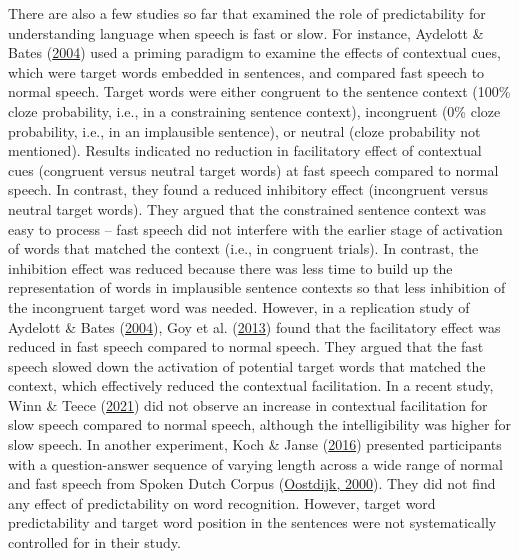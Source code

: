 \documentclass[a4paper, nobind]{templates/ociamthesis}
\begin{document}
There are also a few studies so far that examined the role of predictability for understanding language when speech is fast or slow.
For instance, Aydelott \& Bates (\protect\hyperlink{ref-Aydelott2004}{2004}) used a priming paradigm to examine the effects of contextual cues, which were target words embedded in sentences, and compared fast speech to normal speech.
Target words were either congruent to the sentence context (100\% cloze probability, i.e., in a constraining sentence context), incongruent (0\% cloze probability, i.e., in an implausible sentence), or neutral (cloze probability not mentioned). Results indicated no reduction in facilitatory effect of contextual cues (congruent versus neutral target words) at fast speech compared to normal speech.
In contrast, they found a reduced inhibitory effect (incongruent versus neutral target words).
They argued that the constrained sentence context was easy to process -- fast speech did not interfere with the earlier stage of activation of words that matched the context (i.e., in congruent trials).
In contrast, the inhibition effect was reduced because there was less time to build up the representation of words in implausible sentence contexts so that less inhibition of the incongruent target word was needed.
However, in a replication study of Aydelott \& Bates (\protect\hyperlink{ref-Aydelott2004}{2004}), Goy et al. (\protect\hyperlink{ref-Goy2013}{2013}) found that the facilitatory effect was reduced in fast speech compared to normal speech.
They argued that the fast speech slowed down the activation of potential target words that matched the context, which effectively reduced the contextual facilitation.
In a recent study, Winn \& Teece (\protect\hyperlink{ref-Winn2021b}{2021}) did not observe an increase in contextual facilitation for slow speech compared to normal speech, although the intelligibility was higher for slow speech.
In another experiment, Koch \& Janse (\protect\hyperlink{ref-Koch2016a}{2016}) presented participants with a question-answer sequence of varying length across a wide range of normal and fast speech from Spoken Dutch Corpus (\protect\hyperlink{ref-Oostdijk2000}{Oostdijk, 2000}).
They did not find any effect of predictability on word recognition. However, target word predictability and target word position in the sentences were not systematically controlled for in their study.
\end{document}
